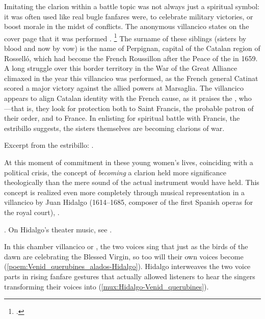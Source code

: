 Imitating the clarion within a battle topic was not always just a spiritual
symbol: it was often used like real bugle fanfares were, to celebrate military
victories, or boost morale in the midst of conflicts.
The anonymous villancico  states on the cover
page that it was performed .%
    \footnote{.}
The surname of these siblings (sisters by blood and now by vow) is the name of
Perpignan, capital of the Catalan region of Rosselló, which had become the
French Roussillon after the Peace of the \XXX[Pyrennees] in 1659.
A long struggle over this border territory in the War of the Great Alliance
climaxed in the year this villancico was performed, as the French general
Catinat scored a major victory against the allied powers at Marsaglia.%
    \citXXX[history]
The villancico appears to align Catalan identity with the French cause, as it
praises the , who
---that is,
they look for protection both to Saint Francis, the probable patron of their
order, and to France.
In enlisting for spiritual battle with Francis, the estribillo suggests, the
sisters themselves are becoming clarions of war.%
\begin{Footnote}
    Excerpt from the estribillo: 
    .
\end{Footnote}

At this moment of commitment in these young women's lives, coinciding with a
political crisis, the concept of \emph{becoming} a clarion held more
significance theologically than the mere sound of the actual instrument would
have held.
This concept is realized even more completely through musical representation in
a villancico by Juan Hidalgo (1614--1685, composer of the first Spanish operas
for the royal court), .%
\begin{Footnote}
    . 
    On Hidalgo's theater music, see \citXXX[Stein].
\end{Footnote}
In this chamber villancico or , the two voices sing that just
as the birds of the dawn are  celebrating the Blessed Virgin, so
too will their own voices become 
(\cref{poem:Venid_querubines_alados-Hidalgo}).
Hidalgo interweaves the two voice parts in rising fanfare gestures that
actually allowed listeners to hear the singers transforming their voices into
 (\cref{mux:Hidalgo-Venid_querubines}).


